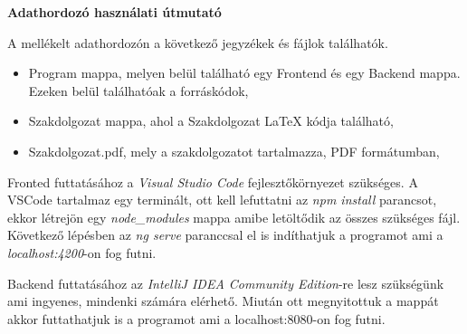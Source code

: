 \pagestyle{empty}

\noindent \textbf{\Large Adathordozó használati útmutató}

\vskip 1cm


A mellékelt adathordozón a következő jegyzékek és fájlok találhatók.

\begin{itemize}
\item Program mappa, melyen belül található egy Frontend és egy Backend mappa. Ezeken belül találhatóak a forráskódok,
\item Szakdolgozat mappa, ahol a Szakdolgozat LaTeX kódja található,
\item Szakdolgozat.pdf, mely a szakdolgozatot tartalmazza, PDF formátumban,
\end{itemize}

Fronted futtatásához a \textit{Visual Studio Code} fejlesztőkörnyezet szükséges. A VSCode tartalmaz egy terminált, ott kell lefuttatni az \textit{npm install} parancsot, ekkor létrejön egy \textit{node\_modules} mappa amibe letöltődik az összes szükséges fájl. Következő lépésben az \textit{ng serve} paranccsal el is indíthatjuk a programot ami a \textit{localhost:4200}-on fog futni.

Backend futtatásához az \textit{IntelliJ IDEA Community Edition}-re lesz szükségünk ami ingyenes, mindenki számára elérhető. Miután ott megnyitottuk a mappát akkor futtathatjuk is a programot ami a {localhost:8080}-on fog futni.